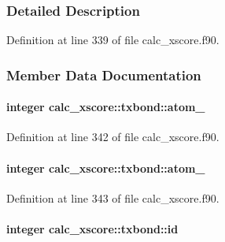 \subsubsection{Detailed Description}


Definition at line 339 of file calc\-\_\-xscore.\-f90.



\subsubsection{Member Data Documentation}
\hypertarget{structcalc__xscore_1_1txbond_abce26fa72f5d430ce6d2c56f9980aaf5}{
\paragraph[{atom\-\_\-1}]{\setlength{\rightskip}{0pt plus 5cm}integer calc\-\_\-xscore\-::txbond\-::atom\-\_}}\label{structcalc__xscore_1_1txbond_abce26fa72f5d430ce6d2c56f9980aaf5}


Definition at line 342 of file calc\-\_\-xscore.\-f90.

\hypertarget{structcalc__xscore_1_1txbond_aadabb5620a8b76bbf5620029147a06b9}{
\paragraph[{atom\-\_\-2}]{\setlength{\rightskip}{0pt plus 5cm}integer calc\-\_\-xscore\-::txbond\-::atom\-\_}}\label{structcalc__xscore_1_1txbond_aadabb5620a8b76bbf5620029147a06b9}


Definition at line 343 of file calc\-\_\-xscore.\-f90.

\hypertarget{structcalc__xscore_1_1txbond_abb70954c3e520828dcc6af12c952f654}{
\paragraph[{id}]{\setlength{\rightskip}{0pt plus 5cm}integer calc\-\_\-xscore\-::txbond\-::id}}\label{structcalc__xscore_1_1txbond_abb70954c3e520828dcc6af12c952f654}


